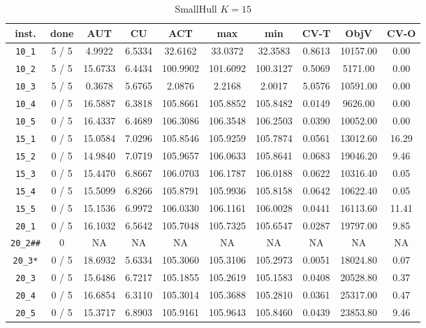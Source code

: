 \begin{table}[h!]
\begin{center}
\small
\begin{tabular}{| c | c | c | c | c | c | c | c | c | c |}
\hline
inst. & done & AUT & CU & ACT & max & min & CV-T & ObjV & CV-O \\
\hline
\verb|10_1| & 5 / 5 & 4.9922 & 6.5334 & 32.6162 & 33.0372 & 32.3583 & 0.8613 & 10157.00 & 0.00\\ 
\verb|10_2| & 5 / 5 & 15.6733 & 6.4434 & 100.9902 & 101.6092 & 100.3127 & 0.5069 & 5171.00 & 0.00\\ 
\verb|10_3| & 5 / 5 & 0.3678 & 5.6765 & 2.0876 & 2.2168 & 2.0017 & 5.0576 & 10591.00 & 0.00\\ 
\verb|10_4| & 0 / 5 & 16.5887 & 6.3818 & 105.8661 & 105.8852 & 105.8482 & 0.0149 & 9626.00 & 0.00\\ 
\verb|10_5| & 0 / 5 & 16.4337 & 6.4689 & 106.3086 & 106.3548 & 106.2503 & 0.0390 & 10052.00 & 0.00\\ 
\verb|15_1| & 0 / 5 & 15.0584 & 7.0296 & 105.8546 & 105.9259 & 105.7874 & 0.0561 & 13012.60 & 16.29\\ 
\verb|15_2| & 0 / 5 & 14.9840 & 7.0719 & 105.9657 & 106.0633 & 105.8641 & 0.0683 & 19046.20 & 9.46\\ 
\verb|15_3| & 0 / 5 & 15.4470 & 6.8667 & 106.0703 & 106.1787 & 106.0188 & 0.0622 & 10316.40 & 0.05\\ 
\verb|15_4| & 0 / 5 & 15.5099 & 6.8266 & 105.8791 & 105.9936 & 105.8158 & 0.0642 & 10622.40 & 0.05\\ 
\verb|15_5| & 0 / 5 & 15.1536 & 6.9972 & 106.0330 & 106.1161 & 106.0028 & 0.0441 & 16113.60 & 11.41\\ 
\verb|20_1| & 0 / 5 & 16.1032 & 6.5642 & 105.7048 & 105.7325 & 105.6547 & 0.0287 & 19797.00 & 9.85\\ 
\verb|20_2##| & 0 & NA & NA & NA & NA & NA & NA & NA & NA \\ 
\verb|20_3*| & 0 / 5 & 18.6932 & 5.6334 & 105.3060 & 105.3106 & 105.2973 & 0.0051 & 18024.80 & 0.07\\ 
\verb|20_3| & 0 / 5 & 15.6486 & 6.7217 & 105.1855 & 105.2619 & 105.1583 & 0.0408 & 20528.80 & 0.37\\ 
\verb|20_4| & 0 / 5 & 16.6854 & 6.3110 & 105.3014 & 105.3688 & 105.2810 & 0.0361 & 25317.00 & 0.47\\ 
\verb|20_5| & 0 / 5 & 15.3717 & 6.8903 & 105.9161 & 105.9643 & 105.8460 & 0.0439 & 23853.80 & 9.46\\ 
\hline
\end{tabular}
\caption{SmallHull $K = 15$}
\label{table:hull:15}
\end{center}
\end{table}
